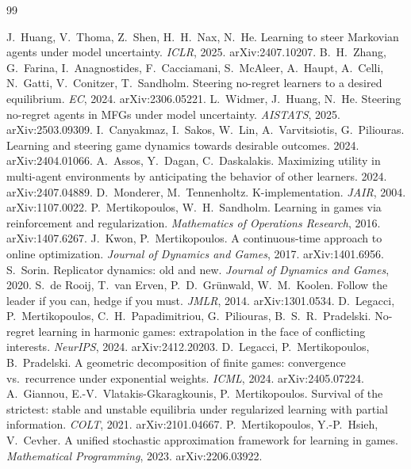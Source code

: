 \documentclass[11pt,a4paper]{article}
\theoremstyle{definition}
\theoremstyle{plain}
\begin{document}
\begin{thebibliography}{99}\small
\setlength{\itemsep}{0.15em}

 J.~Huang, V.~Thoma, Z.~Shen, H.~H.~Nax, N.~He. Learning to steer Markovian agents under model uncertainty. \emph{ICLR}, 2025. arXiv:2407.10207.
 B.~H.~Zhang, G.~Farina, I.~Anagnostides, F.~Cacciamani, S.~McAleer, A.~Haupt, A.~Celli, N.~Gatti, V.~Conitzer, T.~Sandholm. Steering no-regret learners to a desired equilibrium. \emph{EC}, 2024. arXiv:2306.05221.
 L.~Widmer, J.~Huang, N.~He. Steering no-regret agents in MFGs under model uncertainty. \emph{AISTATS}, 2025. arXiv:2503.09309.
 I.~Canyakmaz, I.~Sakos, W.~Lin, A.~Varvitsiotis, G.~Piliouras. Learning and steering game dynamics towards desirable outcomes. 2024. arXiv:2404.01066.
 A.~Assos, Y.~Dagan, C.~Daskalakis. Maximizing utility in multi-agent environments by anticipating the behavior of other learners. 2024. arXiv:2407.04889.
 D.~Monderer, M.~Tennenholtz. K-implementation. \emph{JAIR}, 2004. arXiv:1107.0022.
 P.~Mertikopoulos, W.~H.~Sandholm. Learning in games via reinforcement and regularization. \emph{Mathematics of Operations Research}, 2016. arXiv:1407.6267.
 J.~Kwon, P.~Mertikopoulos. A continuous-time approach to online optimization. \emph{Journal of Dynamics and Games}, 2017. arXiv:1401.6956.
 S.~Sorin. Replicator dynamics: old and new. \emph{Journal of Dynamics and Games}, 2020.
 S.~de Rooij, T.~van Erven, P.~D.~Gr\"unwald, W.~M.~Koolen. Follow the leader if you can, hedge if you must. \emph{JMLR}, 2014. arXiv:1301.0534.
 D.~Legacci, P.~Mertikopoulos, C.~H.~Papadimitriou, G.~Piliouras, B.~S.~R.~Pradelski. No-regret learning in harmonic games: extrapolation in the face of conflicting interests. \emph{NeurIPS}, 2024. arXiv:2412.20203.
 D.~Legacci, P.~Mertikopoulos, B.~Pradelski. A geometric decomposition of finite games: convergence vs.\ recurrence under exponential weights. \emph{ICML}, 2024. arXiv:2405.07224.
 A.~Giannou, E.-V.~Vlatakis-Gkaragkounis, P.~Mertikopoulos. Survival of the strictest: stable and unstable equilibria under regularized learning with partial information. \emph{COLT}, 2021. arXiv:2101.04667.
 P.~Mertikopoulos, Y.-P.~Hsieh, V.~Cevher. A unified stochastic approximation framework for learning in games. \emph{Mathematical Programming}, 2023. arXiv:2206.03922.

\end{thebibliography}
\end{document}
